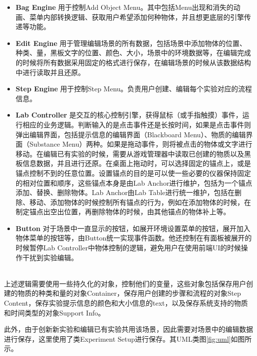 \begin{itemize}
    \item \textbf{Bag Engine}
用于控制Add Object Menu。其中包括Menu出现和消失的动画、菜单内部转换逻辑、获取用户希望添加何种物体，并且想更底层的引擎传递等功能。
    
    \item \textbf{Edit Engine}
用于管理编辑场景的所有数据，包括场景中添加物体的位置、种类、量，黑板文字的位置、颜色、大小，场景中的环境数据等，在编辑完成的时候将所有数据采用固定的格式进行保存，在编辑场景的时候从该数据结构中进行读取并且还原。
    
    \item \textbf{Step Engine}
用于控制Step Menu。负责用户创建、编辑每个实验对应的流程信息。

    \item \textbf{Lab Controller}
是交互的核心控制引擎，获得鼠标（或手指触摸）事件，运行相应的业务逻辑。判断输入的是点击事件还是长按时间，如果是点击事件则弹出编辑界面，包括提示信息的编辑界面（Blackboard Menu）、物质的编辑界面（Substance Menu）两种。如果是拖动事件，则将被点击的物体或文字进行移动。在编辑已有实验的时候，需要从游戏管理器中读取已创建的物质以及黑板信息数据，并且进行还原。在桌面上拖动时，可以选择固定的锚点上，或是锚点控制不到的任意位置。设置锚点的目的是可以使一些必要的仪器保持固定的相对位置和顺序，这些锚点本身是由Lab Anchor进行维护，包括为一个锚点添加、替换、删除物体。Lab Anchor由Lab Table进行统一维护，包括在删除、移动、添加物体的时候控制所有锚点的行为，例如在添加物体的时候，在制定锚点出空出位置，再删除物体的时候，由其他锚点的物体补上等。

    \item \textbf{Button}
对于场景中一直显示的按钮，如展开环境设置菜单的按钮，展开加入物体菜单的按钮等，由Button统一实现事件函数。他还控制在有面板被展开的时候暂停Lab Controller中物体控制的逻辑，避免用户在使用前端UI的时候操作干扰到实验编辑。
\end{itemize}
~\\
\indent    	上述逻辑需要使用一些持久化的对象，控制他们的变量，这些对象包括保存用户创建的物质的种类和量的对象Container，保存用户创建的步骤和流程的对象Step Content，保存实验提示信息的颜色和大小信息的text，以及保存系统支持的物质和时间类型的对象Support Info。

此外，由于创新新实验和编辑已有实验共用该场景，因此需要对场景中的编辑数据进行保存，这里使用了类Experiment Setup进行保存。其UML类图\ref{fig:uml}如图所示。


